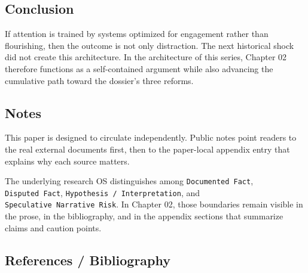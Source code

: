 \documentclass[
  american,
  11pt,
  letterpaper,
]{article}
\begin{document}
\subsection{Conclusion}\label{conclusion}

If attention is trained by systems optimized for engagement rather than
flourishing, then the outcome is not only distraction. The next
historical shock did not create this architecture. In the architecture
of this series, Chapter 02 therefore functions as a self-contained
argument while also advancing the cumulative path toward the dossier's
three reforms.

\subsection{Notes}\label{notes}

This paper is designed to circulate independently. Public notes point
readers to the real external documents first, then to the paper-local
appendix entry that explains why each source matters.

The underlying research OS distinguishes among
\texttt{Documented\ Fact}, \texttt{Disputed\ Fact},
\texttt{Hypothesis\ /\ Interpretation}, and
\texttt{Speculative\ Narrative\ Risk}. In Chapter 02, those boundaries
remain visible in the prose, in the bibliography, and in the appendix
sections that summarize claims and caution points.

\subsection{References / Bibliography}\label{references-bibliography}
\end{document}

